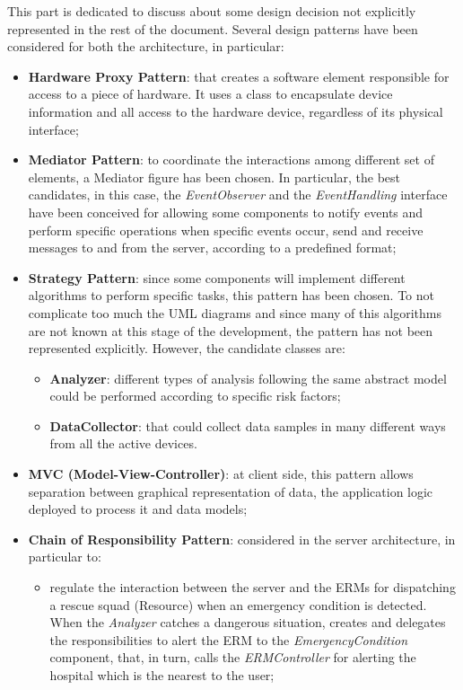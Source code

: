 \begin{flushleft}
{}
{\setlength{\parskip}{0.3cm}
This part is dedicated to discuss about some design decision not explicitly represented in the rest of the document.
Several design patterns have been considered for both the architecture, in particular:
\begin{itemize}
	\item \textbf{Hardware Proxy Pattern}: that creates a software element responsible for access to a piece of hardware. It uses a class to encapsulate device information and all access to the hardware device, regardless of its physical interface;
	\item \textbf{Mediator Pattern}: to coordinate the interactions among different set of elements, a Mediator figure has been chosen. In particular, the best candidates, in this case, the \textit{EventObserver} and the \textit{EventHandling} interface have been conceived for allowing some components to notify events and perform specific operations when specific events occur, send and receive messages to and from the server, according to a predefined format;
	\item \textbf{Strategy Pattern}: since some components will implement different algorithms to perform specific tasks, this pattern has been chosen. To not complicate too much the UML diagrams and since many of this algorithms are not known at this stage of the development, the pattern has not been represented explicitly. However, the candidate classes are:
	\begin{itemize}
		\item \textbf{Analyzer}: different types of analysis following the same abstract model could be performed according to specific risk factors;
		\item \textbf{DataCollector}: that could collect data samples in many different ways from all the active devices.
	\end{itemize}
	\item \textbf{MVC (Model-View-Controller)}: at client side, this pattern allows separation between graphical representation of data, the application logic deployed to process it and data models;
	\item \textbf{Chain of Responsibility Pattern}: considered in the server architecture, in particular to:
	\begin{itemize}
		\item  regulate the interaction between the server and the ERMs for dispatching a rescue squad (Resource) when an emergency condition is detected. When the \textit{Analyzer} catches a dangerous situation, creates and delegates the responsibilities to alert the ERM to the \textit{EmergencyCondition} component, that, in turn, calls the \textit{ERMController} for alerting the hospital which is the nearest to the user;

\end{itemize}
\end{itemize}}
\end{flushleft}

